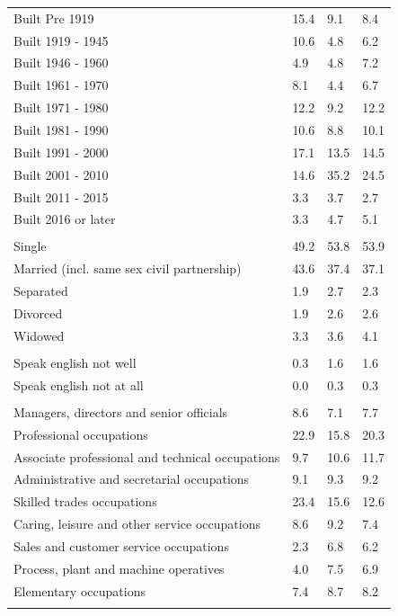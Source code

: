 \documentclass{article}
\begin{document}
\begin{table}[h]
\begin{tabular}{KTTT}
    \hline
Built Pre 1919 & 15.4&  9.1&  8.4\\
Built 1919 - 1945 & 10.6&  4.8&  6.2\\
Built  1946 - 1960 & 4.9& 4.8& 7.2\\
Built  1961 - 1970 & 8.1& 4.4& 6.7\\
Built  1971 - 1980 & 12.2&  9.2& 12.2\\
Built  1981 - 1990 & 10.6&  8.8& 10.1\\
Built  1991 - 2000 & 17.1& 13.5& 14.5\\
Built  2001 - 2010 & 14.6& 35.2& 24.5\\
Built  2011 - 2015 & 3.3& 3.7& 2.7\\
Built  2016 or later & 3.3& 4.7& 5.1\\
\hline
    \\
    \hline
Single & 49.2& 53.8& 53.9\\
Married (incl. same sex civil partnership) & 43.6& 37.4& 37.1\\
Separated  & 1.9& 2.7& 2.3\\
Divorced  & 1.9& 2.6& 2.6\\
Widowed & 3.3& 3.6& 4.1\\
\hline
    \\ 
    \hline
Speak english not well & 0.3& 1.6& 1.6\\
Speak english not at all & 0.0& 0.3& 0.3\\
\hline
    \\
    \hline
Managers, directors and senior officials & 8.6& 7.1& 7.7\\
Professional occupations & 22.9& 15.8& 20.3\\
Associate professional and technical occupations &  9.7& 10.6& 11.7\\
Administrative and secretarial occupations & 9.1& 9.3& 9.2\\
Skilled trades occupations & 23.4& 15.6& 12.6\\
Caring, leisure and other service occupations & 8.6& 9.2& 7.4\\
Sales and customer service occupations & 2.3& 6.8& 6.2\\
Process, plant and machine operatives & 4.0& 7.5& 6.9\\
Elementary occupations & 7.4& 8.7& 8.2\\
\hline
\end{tabular}
\end{table}
\end{document}
